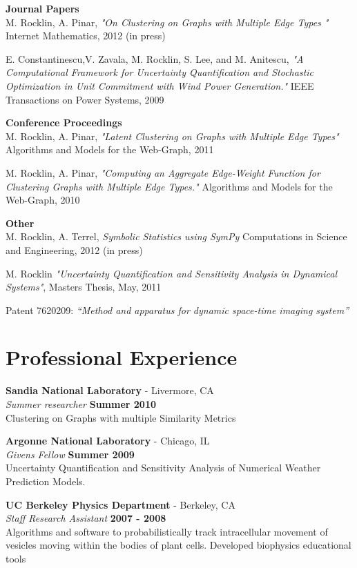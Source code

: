 \documentclass[margin,line]{res}
\begin{document}
\begin{resume}
{\bf Journal Papers}\\
M. Rocklin, A. Pinar, \textit{"On Clustering on Graphs with Multiple Edge Types
"} Internet Mathematics, 2012 (in press)

E. Constantinescu,V. Zavala, M. Rocklin, S. Lee, and M. Anitescu, \textit{"A Computational Framework for Uncertainty Quantification and Stochastic Optimization in Unit Commitment with Wind Power Generation."} IEEE Transactions on Power Systems, 2009


{\bf Conference Proceedings}\\
M. Rocklin, A. Pinar, \textit{"Latent Clustering on Graphs with Multiple Edge Types"} Algorithms and Models for the Web-Graph, 2011

M. Rocklin, A. Pinar, \textit{"Computing an Aggregate Edge-Weight Function for Clustering Graphs with Multiple Edge Types."} Algorithms and Models for the Web-Graph, 2010

{\bf Other}\\
M. Rocklin, A. Terrel, \textit{Symbolic Statistics using SymPy} Computations in
Science and Engineering, 2012 (in press)

M. Rocklin \textit{"Uncertainty Quantification and Sensitivity Analysis in Dynamical Systems"}, Masters Thesis, May, 2011

Patent 7620209: \textit{“Method and apparatus for dynamic space-time imaging system”}

\section{\sc Professional Experience}

{\bf Sandia National Laboratory } - Livermore, CA\\
{\em Summer researcher} \hfill {\bf Summer 2010}\\
Clustering on Graphs with multiple Similarity Metrics 

{\bf Argonne National Laboratory} - Chicago, IL\\
{\em Givens Fellow} \hfill {\bf Summer 2009}\\
Uncertainty Quantification and Sensitivity Analysis of Numerical Weather Prediction Models.

{\bf UC Berkeley Physics Department} - Berkeley, CA\\
{\em Staff Research Assistant} \hfill {\bf 2007 - 2008}\\
Algorithms and software to probabilistically track intracellular movement of vesicles moving within the bodies of plant cells. Developed biophysics educational tools


\end{resume}
\end{document}
